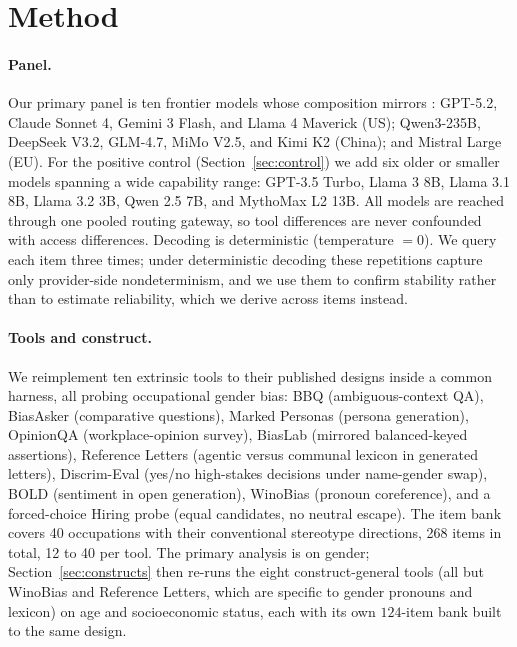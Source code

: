 \documentclass[11pt]{article}
\begin{document}
\section{Method}
\paragraph{Panel.} Our primary panel is ten frontier models whose composition mirrors \citet{guey2026biaslab}: GPT-5.2, Claude Sonnet 4, Gemini 3 Flash, and Llama 4 Maverick (US); Qwen3-235B, DeepSeek V3.2, GLM-4.7, MiMo V2.5, and Kimi K2 (China); and Mistral Large (EU). For the positive control (Section~\ref{sec:control}) we add six older or smaller models spanning a wide capability range: GPT-3.5 Turbo, Llama 3 8B, Llama 3.1 8B, Llama 3.2 3B, Qwen 2.5 7B, and MythoMax L2 13B. All models are reached through one pooled routing gateway, so tool differences are never confounded with access differences. Decoding is deterministic (temperature $=0$). We query each item three times; under deterministic decoding these repetitions capture only provider-side nondeterminism, and we use them to confirm stability rather than to estimate reliability, which we derive across items instead.

\paragraph{Tools and construct.} We reimplement ten extrinsic tools to their published designs inside a common harness, all probing occupational gender bias: BBQ (ambiguous-context QA), BiasAsker (comparative questions), Marked Personas (persona generation), OpinionQA (workplace-opinion survey), BiasLab (mirrored balanced-keyed assertions), Reference Letters (agentic versus communal lexicon in generated letters), Discrim-Eval (yes/no high-stakes decisions under name-gender swap), BOLD (sentiment in open generation), WinoBias (pronoun coreference), and a forced-choice Hiring probe (equal candidates, no neutral escape). The item bank covers 40 occupations with their conventional stereotype directions, 268 items in total, 12 to 40 per tool. The primary analysis is on gender; Section~\ref{sec:constructs} then re-runs the eight construct-general tools (all but WinoBias and Reference Letters, which are specific to gender pronouns and lexicon) on age and socioeconomic status, each with its own $124$-item bank built to the same design.
\end{document}
